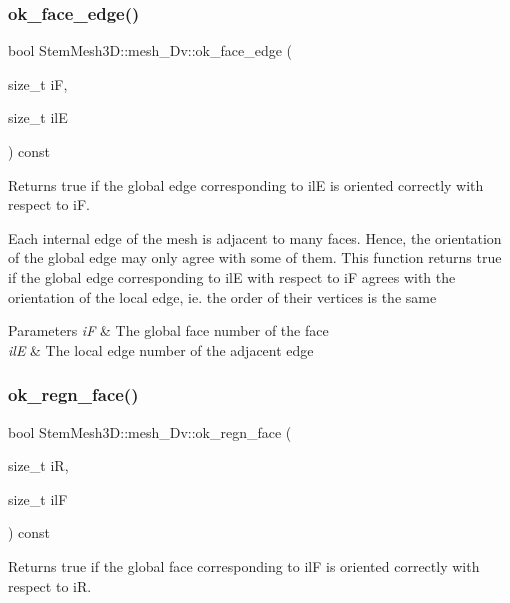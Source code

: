 \subsubsection{\texorpdfstring{ok\+\_\+face\+\_\+edge()}{ok\_face\_edge()}}
{\footnotesize\ttfamily bool Stem\+Mesh3\+D\+::mesh\+\_\+Dv\+::ok\+\_\+face\+\_\+edge (\begin{DoxyParamCaption}\item[{size\+\_\+t}]{iF,  }\item[{size\+\_\+t}]{ilE }\end{DoxyParamCaption}) const}



Returns true if the global edge corresponding to ilE is oriented correctly with respect to iF. 

Each internal edge of the mesh is adjacent to many faces. Hence, the orientation of the global edge may only agree with some of them. This function returns true if the global edge corresponding to ilE with respect to iF agrees with the orientation of the local edge, ie. the order of their vertices is the same 
\begin{DoxyParams}{Parameters}
{\em iF} & The global face number of the face \\
\hline
{\em ilE} & The local edge number of the adjacent edge \\
\hline
\end{DoxyParams}
\mbox{\label{classStemMesh3D_1_1mesh__3Dv_a4c6ab11bf9ea2eac1709052d14f5c5b3}} 
\subsubsection{\texorpdfstring{ok\+\_\+regn\+\_\+face()}{ok\_regn\_face()}}
{\footnotesize\ttfamily bool Stem\+Mesh3\+D\+::mesh\+\_\+Dv\+::ok\+\_\+regn\+\_\+face (\begin{DoxyParamCaption}\item[{size\+\_\+t}]{iR,  }\item[{size\+\_\+t}]{ilF }\end{DoxyParamCaption}) const}



Returns true if the global face corresponding to ilF is oriented correctly with respect to iR. 

